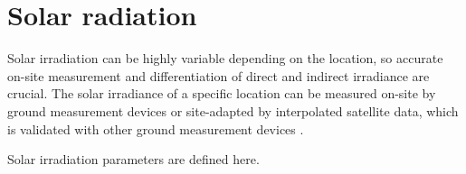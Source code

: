 \section{Solar radiation} \label{Solar radiation}
Solar irradiation can be highly variable depending on the location, so accurate on-site measurement and differentiation of direct and indirect irradiance are crucial. The solar irradiance of a specific location can be measured on-site by ground measurement devices or site-adapted by interpolated satellite data, which is validated with other ground measurement devices \cite{Paulescu2013}.

Solar irradiation parameters are defined here.

